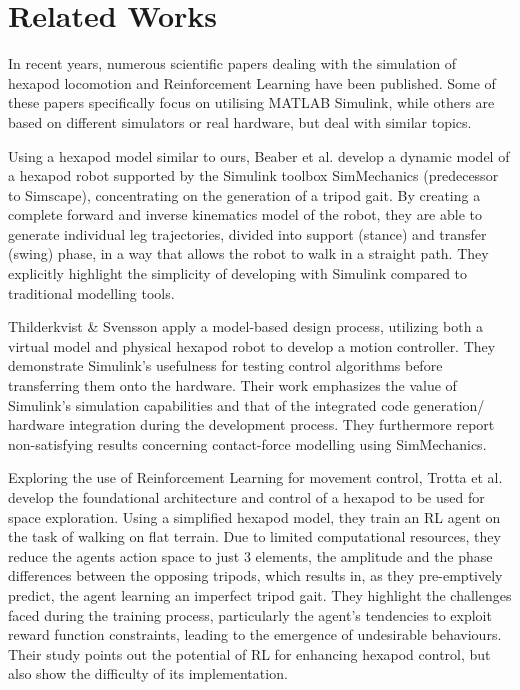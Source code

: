 \chapter{Related Works}
\label{ch:relatedWorks}

In recent years, numerous scientific papers dealing with the simulation of hexapod locomotion and Reinforcement Learning have been published.
Some of these papers specifically focus on utilising MATLAB Simulink, while others are based on different simulators or real hardware, but deal with similar topics.

Using a hexapod model similar to ours, Beaber et al. \parencite{beaber2018dynamic} develop a dynamic model of a hexapod robot supported by the Simulink toolbox SimMechanics (predecessor to Simscape), concentrating on the generation of  a tripod gait.
By creating a complete forward and inverse kinematics model of the robot, they are able to generate individual leg trajectories, divided into support (stance) and transfer (swing) phase, in a way that allows the robot to walk in a straight path.
They explicitly highlight the simplicity of developing with Simulink compared to traditional modelling tools.

Thilderkvist \& Svensson \Parencite{thilderkvist2015motion} apply a model-based design process, utilizing both a virtual model and physical hexapod robot to develop a motion controller.
They demonstrate Simulink's usefulness for testing control algorithms before transferring them onto the hardware.
Their work emphasizes the value of Simulink's simulation capabilities and that of the integrated code generation/ hardware integration during the development process.
They furthermore report non-satisfying results concerning contact-force modelling using SimMechanics.

Exploring the use of Reinforcement Learning for movement control, Trotta et al. \parencite{trotta2022walking} develop the foundational architecture and control of a hexapod to be used for space exploration.
Using a simplified hexapod model, they train an RL agent on the task of walking on flat terrain.
Due to limited computational resources, they reduce the agents action space to just 3 elements, the amplitude and the phase differences between the opposing tripods, which results in, as they pre-emptively predict, the agent learning an imperfect tripod gait.
They highlight the challenges faced during the training process, particularly the agent's tendencies to exploit reward function constraints, leading to the emergence of undesirable behaviours.
Their study points out the potential of RL for enhancing hexapod control, but also show the difficulty of its implementation.
